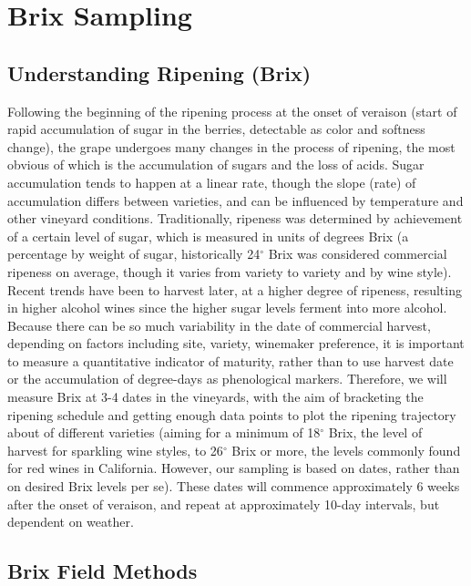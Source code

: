 \documentclass[11pt,letter]{article}
\begin{document}
\section{Brix Sampling}
\subsection{Understanding Ripening (Brix)}

Following the beginning of the ripening process at the onset of veraison (start of rapid accumulation of sugar in the berries, detectable as color and softness change), the grape undergoes many changes in the process of ripening, the most obvious of which is the accumulation of sugars and the loss of acids. Sugar accumulation tends to happen at a linear rate, though the slope (rate) of accumulation differs between varieties, and can be influenced by temperature and other vineyard conditions. Traditionally, ripeness was determined by achievement of a certain level of sugar, which is measured in units of degrees Brix (a percentage by weight of sugar, historically 24$^{\circ}$ Brix was considered commercial ripeness on average, though it varies from variety to variety and by wine style). Recent trends have been to harvest later, at a higher degree of ripeness, resulting in higher alcohol wines since the higher sugar levels ferment into more alcohol. \\

Because there can be so much variability in the date of commercial harvest, depending on factors including site, variety, winemaker preference, it is important to measure a quantitative indicator of maturity, rather than to use harvest date or the accumulation of degree-days as phenological markers. Therefore, we will measure Brix at 3-4 dates in the vineyards, with the aim of bracketing the ripening schedule and getting enough data points to plot the ripening trajectory about of different varieties (aiming for a minimum of 18$^{\circ}$ Brix, the level of harvest for sparkling wine styles, to  26$^{\circ}$ Brix or more, the levels commonly found for red wines in California. However, our sampling is based on dates, rather than on desired Brix levels per se). These dates will commence approximately 6 weeks after the onset of veraison, and repeat at approximately 10-day intervals, but dependent on weather. 

\subsection{Brix Field Methods}
\end{document}
